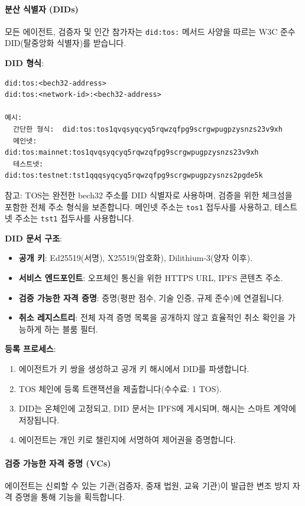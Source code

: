 \documentclass[11pt]{article}
\begin{document}
\paragraph{분산 식별자 (DIDs)}
모든 에이전트, 검증자 및 인간 참가자는 \texttt{did:tos:} 메서드 사양을 따르는 W3C 준수 DID(탈중앙화 식별자)를 받습니다.

\textbf{DID 형식}:
\begin{verbatim}
did:tos:<bech32-address>
did:tos:<network-id>:<bech32-address>

예시:
  간단한 형식:  did:tos:tos1qvqsyqcyq5rqwzqfpg9scrgwpugpzysnzs23v9xh
  메인넷:      did:tos:mainnet:tos1qvqsyqcyq5rqwzqfpg9scrgwpugpzysnzs23v9xh
  테스트넷:    did:tos:testnet:tst1qqqsyqcyq5rqwzqfpg9scrgwpugpzysnzs2pgde5k
\end{verbatim}
참고: TOS는 완전한 bech32 주소를 DID 식별자로 사용하며, 검증을 위한 체크섬을 포함한 전체 주소 형식을 보존합니다. 메인넷 주소는 \texttt{tos1} 접두사를 사용하고, 테스트넷 주소는 \texttt{tst1} 접두사를 사용합니다.

\textbf{DID 문서 구조}:
\begin{itemize}[noitemsep]
  \item \textbf{공개 키}: Ed25519(서명), X25519(암호화), Dilithium-3(양자 이후).
  \item \textbf{서비스 엔드포인트}: 오프체인 통신을 위한 HTTPS URL, IPFS 콘텐츠 주소.
  \item \textbf{검증 가능한 자격 증명}: 증명(평판 점수, 기술 인증, 규제 준수)에 연결됩니다.
  \item \textbf{취소 레지스트리}: 전체 자격 증명 목록을 공개하지 않고 효율적인 취소 확인을 가능하게 하는 블룸 필터.
\end{itemize}

\textbf{등록 프로세스}:
\begin{enumerate}[noitemsep]
  \item 에이전트가 키 쌍을 생성하고 공개 키 해시에서 DID를 파생합니다.
  \item TOS 체인에 등록 트랜잭션을 제출합니다(수수료: 1 TOS).
  \item DID는 온체인에 고정되고, DID 문서는 IPFS에 게시되며, 해시는 스마트 계약에 저장됩니다.
  \item 에이전트는 개인 키로 챌린지에 서명하여 제어권을 증명합니다.
\end{enumerate}

\paragraph{검증 가능한 자격 증명 (VCs)}
에이전트는 신뢰할 수 있는 기관(검증자, 중재 법원, 교육 기관)이 발급한 변조 방지 자격 증명을 통해 기능을 획득합니다.
\end{document}
